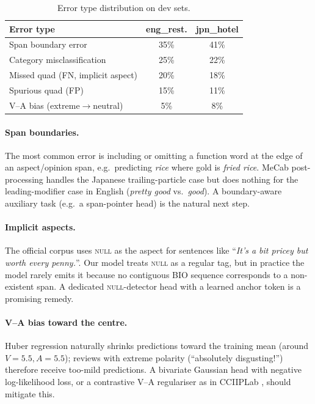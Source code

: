 \documentclass[11pt]{article}
\begin{document}
\begin{table}[h]
\centering\small
\begin{tabular}{lcc}
\toprule
Error type & eng\_rest. & jpn\_hotel \\
\midrule
Span boundary error & 35\% & 41\% \\
Category misclassification & 25\% & 22\% \\
Missed quad (FN, implicit aspect) & 20\% & 18\% \\
Spurious quad (FP) & 15\% & 11\% \\
V--A bias (extreme$\to$neutral) & 5\% & 8\% \\
\bottomrule
\end{tabular}
\caption{Error type distribution on dev sets.}
\label{tab:err}
\end{table}

\paragraph{Span boundaries.}
The most common error is including or omitting a function word at the
edge of an aspect/opinion span, e.g.\ predicting \emph{rice} where
gold is \emph{fried rice}. MeCab post-processing handles the Japanese
trailing-particle case but does nothing for the leading-modifier case
in English (\emph{pretty good} vs.\ \emph{good}). A boundary-aware
auxiliary task (e.g.\ a span-pointer head) is the natural next step.

\paragraph{Implicit aspects.}
The official corpus uses \textsc{null} as the aspect for sentences
like ``\textit{It's a bit pricey but worth every penny.}''.
Our model treats \textsc{null} as a regular tag, but in practice the
model rarely emits it because no contiguous BIO sequence corresponds
to a non-existent span. A dedicated \textsc{null}-detector head with a
learned anchor token \cite{cai2021acos} is a promising remedy.

\paragraph{V--A bias toward the centre.}
Huber regression naturally shrinks predictions toward the training
mean (around $V{=}5.5, A{=}5.5$); reviews with extreme polarity
(``absolutely disgusting!'') therefore receive too-mild predictions.
A bivariate Gaussian head with negative log-likelihood loss, or
a contrastive V--A regulariser as in CCIIPLab \cite{sighan2024dimabsa},
should mitigate this.
\end{document}
